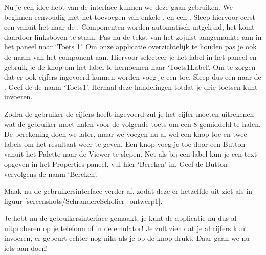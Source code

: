 Nu je een idee hebt van de interface kunnen we deze gaan gebruiken. We beginnen eenvoudig met het toevoegen van enkele ,  en een . Sleep hiervoor eerst een  vanuit het  naar de . Componenten worden automatisch uitgelijnd, het  komt daardoor linksboven te staan. Pas nu de tekst van het zojuist aangemaakte  aan in het  paneel naar `Toets 1'. Om onze applicatie overzichtelijk te houden pas je ook de naam van het component aan. Hiervoor selecteer je het label in het  paneel en gebruik je de knop  om het label te hernoemen naar `Toets1Label'.
Om te zorgen dat er ook cijfers ingevoerd kunnen worden voeg je een  toe. 
Sleep dus een  naar de . 
Geef de  de naam `Toets1'. Herhaal deze handelingen totdat je drie toetsen kunt invoeren.

Zodra de gebruiker de cijfers heeft ingevoerd zul je het cijfer moeten uitrekenen wat de gebruiker moet halen voor de volgende toets om een 8 gemiddeld te halen. De berekening doen we later, maar we voegen nu al wel een knop toe en twee labels om het resultaat weer te geven. Een knop voeg je toe door een Button vanuit het Palette naar de Viewer te slepen. Net als bij een label kun je een text opgeven in het Properties paneel, vul hier `Bereken' in. Geef de Button vervolgens de naam `Bereken'.

\begin{opgave}
    \opgVraag
Maak nu de gebruikersinterface verder af, zodat deze er hetzelfde uit ziet als in figuur \ref{screenshots/SchrandereScholier_ontwerp1}.
\end{opgave}

\runOpTelefoon{}
Je hebt nu de gebruikersinterface gemaakt, je kunt de applicatie nu dus al uitproberen op je telefoon of in de emulator! Je zult zien dat je al cijfers kunt invoeren, er gebeurt echter nog niks als je op de knop drukt. Daar gaan we nu iets aan doen!

